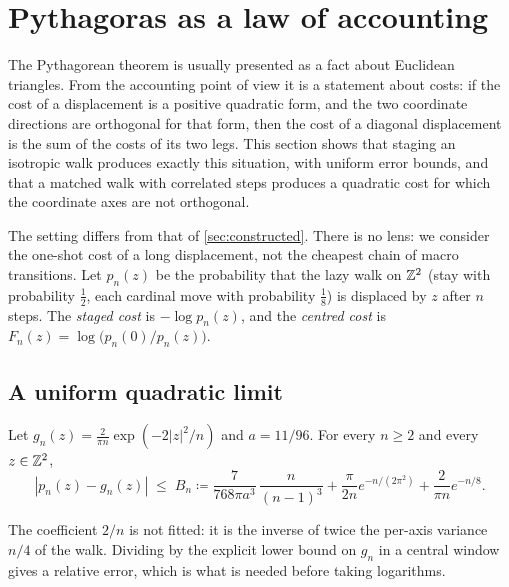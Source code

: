 \section{Pythagoras as a law of accounting}
\label{sec:pythagoras}

The Pythagorean theorem is usually presented as a fact about Euclidean triangles.
From the accounting point of view it is a statement about costs: if the cost of a displacement is a positive quadratic form, and the two coordinate directions are orthogonal for that form, then the cost of a diagonal displacement is the sum of the costs of its two legs.
This section shows that staging an isotropic walk produces exactly this situation, with uniform error bounds, and that a matched walk with correlated steps produces a quadratic cost for which the coordinate axes are not orthogonal.

The setting differs from that of \cref{sec:constructed}.
There is no lens: we consider the one-shot cost of a long displacement, not the cheapest chain of macro transitions.
Let $p_n(z)$ be the probability that the lazy walk on $\mathbb{Z}^2$ (stay with probability $\tfrac12$, each cardinal move with probability $\tfrac18$) is displaced by $z$ after $n$ steps.
The \emph{staged cost} is $-\log p_n(z)$, and the \emph{centred cost} is $F_n(z)=\log\bigl(p_n(0)/p_n(z)\bigr)$.

\subsection{A uniform quadratic limit}

\begin{theorem}
\label{thm:local-limit}
Let $g_n(z)=\frac{2}{\pi n}\exp(-2|z|^2/n)$ and $a=11/96$.
For every $n\ge2$ and every $z\in\mathbb{Z}^2$,
\begin{equation}
|p_n(z)-g_n(z)|\;\le\;B_n\coloneqq\frac{7}{768\pi a^3}\,\frac{n}{(n-1)^3}+\frac{\pi}{2n}e^{-n/(2\pi^2)}+\frac{2}{\pi n}e^{-n/8}.
\end{equation}
\end{theorem}


The coefficient $2/n$ is not fitted: it is the inverse of twice the per-axis variance $n/4$ of the walk.
Dividing by the explicit lower bound on $g_n$ in a central window gives a relative error, which is what is needed before taking logarithms.

